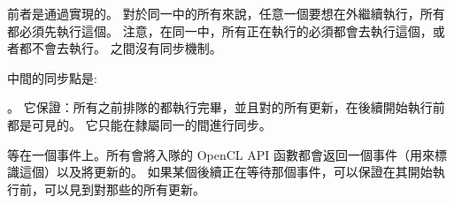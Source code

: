 前者是通過實現的。
對於同一中的所有來說，任意一個要想在外繼續執行，所有都必須先執行這個。
注意，在同一中，所有正在執行的必須都會去執行這個，或者都不會去執行。
之間沒有同步機制。

中間的同步點是:
\startigBase
\item {}。
它保證：所有之前排隊的都執行完畢，並且對的所有更新，在後續開始執行前都是可見的。
它只能在隸屬同一的間進行同步。

\item 等在一個事件上。所有會將入隊的 OpenCL API 函數都會返回一個事件（用來標識這個）以及將更新的。
如果某個後續正在等待那個事件，可以保證在其開始執行前，可以見到對那些的所有更新。
\stopigBase

